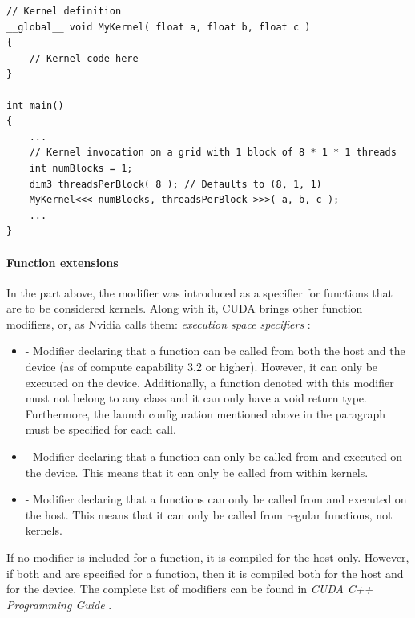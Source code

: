 \begin{lstlisting}[caption={Example of C++ pseudocode of a Kernel launch on a grid consisting of 1 one-dimensional block that is made up of 8 threads. Taken from Nvidia's \emph{CUDA C++ Programming Guide} \cite{NVIDIAMay2022}.},label={Listing:theory-CUDA-kernel-example}]
// Kernel definition
__global__ void MyKernel( float a, float b, float c )
{
	// Kernel code here
}

int main()
{
	...
	// Kernel invocation on a grid with 1 block of 8 * 1 * 1 threads
	int numBlocks = 1;
	dim3 threadsPerBlock( 8 ); // Defaults to (8, 1, 1)
	MyKernel<<< numBlocks, threadsPerBlock >>>( a, b, c );
	...
}
\end{lstlisting}

\paragraph{Function extensions}\label{Paragraph:theory-CUDA-C++-extensions-outer-kernel-extensions-function-extensions}
In the part above, the  modifier was introduced as a specifier for functions that are to be considered kernels. Along with it, CUDA brings other function modifiers, or, as Nvidia calls them: \textit{execution space specifiers} \cite{NVIDIAMay2022}:

\begin{itemize}
	\item {} - Modifier declaring that a function can be called from both the host and the device (as of compute capability 3.2 or higher). However, it can only be executed on the device. Additionally, a function denoted with this modifier must not belong to any class and it can only have a void return type. Furthermore, the launch configuration mentioned above in the \textit{} paragraph must be specified for each call.
	\item {} - Modifier declaring that a function can only be called from and executed on the device. This means that it can only be called from within kernels.
	\item {} - Modifier declaring that a functions can only be called from and executed on the host. This means that it can only be called from regular functions, not kernels.
\end{itemize}

If no modifier is included for a function, it is compiled for the host only. However, if both  and  are specified for a function, then it is compiled both for the host and for the device. The complete list of modifiers can be found in \emph{CUDA C++ Programming Guide} \cite{NVIDIAMay2022}.

